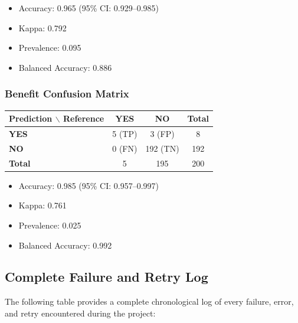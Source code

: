 \begin{itemize}
    \item Accuracy: 0.965 (95\% CI: 0.929--0.985)
    \item Kappa: 0.792
    \item Prevalence: 0.095
    \item Balanced Accuracy: 0.886
\end{itemize}

\subsubsection*{Benefit Confusion Matrix}

\begin{table}[H]
\centering
\begin{tabular}{@{}l|cc|c@{}}
\toprule
\textbf{Prediction $\backslash$ Reference} & \textbf{YES} & \textbf{NO} & \textbf{Total} \\
\midrule
\textbf{YES} & 5 (TP)   & 3 (FP)   & 8 \\
\textbf{NO}  & 0 (FN)   & 192 (TN) & 192 \\
\midrule
\textbf{Total} & 5 & 195 & 200 \\
\bottomrule
\end{tabular}
\end{table}

\begin{itemize}
    \item Accuracy: 0.985 (95\% CI: 0.957--0.997)
    \item Kappa: 0.761
    \item Prevalence: 0.025
    \item Balanced Accuracy: 0.992
\end{itemize}

\subsection{Complete Failure and Retry Log}
\label{app:failures}

The following table provides a complete chronological log of every failure, error, and retry encountered during the project:

